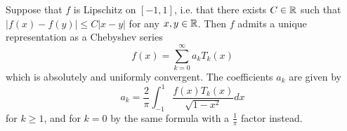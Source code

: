 \begin{theorem} Suppose that $f$ is Lipschitz on $[-1,1]$, i.e. that there exists $C \in \mathbb{R}$ such that $|f(x) - f(y)| \leq C|x - y|$ for any $x, y \in \mathbb{R}$. Then $f$ admits a unique representation as a Chebyshev series
\[ f(x) = \sum_{k=0}^\infty a_k T_k(x) \]
which is absolutely and uniformly convergent. The coefficients $a_k$ are given by
\[ a_k = \frac{2}{\pi} \int_{-1}^1 \frac{f(x)T_k(x)}{\sqrt{1-x^2}} dx \]
for $k \geq 1$, and for $k=0$ by the same formula with a $\frac{1}{\pi}$ factor instead.
\end{theorem}
